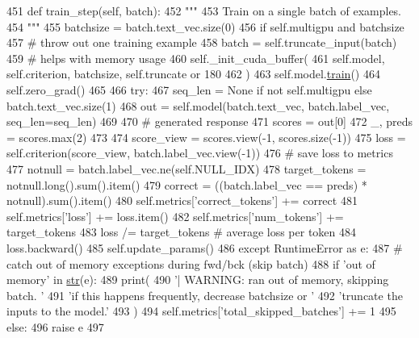 \begin{DoxyCode}
451     \textcolor{keyword}{def }train\_step(self, batch):
452         \textcolor{stringliteral}{"""}
453 \textcolor{stringliteral}{        Train on a single batch of examples.}
454 \textcolor{stringliteral}{        """}
455         batchsize = batch.text\_vec.size(0)
456         \textcolor{keywordflow}{if} self.multigpu \textcolor{keywordflow}{and} batchsize %
457             \textcolor{comment}{# throw out one training example}
458             batch = self.truncate\_input(batch)
459         \textcolor{comment}{# helps with memory usage}
460         self.\_init\_cuda\_buffer(
461             self.model, self.criterion, batchsize, self.truncate \textcolor{keywordflow}{or} 180
462         )
463         self.model.\hyperlink{namespaceprojects_1_1mastering__the__dungeon_1_1mturk_1_1tasks_1_1MTD_1_1run_a36a5f4f6f9df0611a6818610518d2cf0}{train}()
464         self.zero\_grad()
465 
466         \textcolor{keywordflow}{try}:
467             seq\_len = \textcolor{keywordtype}{None} \textcolor{keywordflow}{if} \textcolor{keywordflow}{not} self.multigpu \textcolor{keywordflow}{else} batch.text\_vec.size(1)
468             out = self.model(batch.text\_vec, batch.label\_vec, seq\_len=seq\_len)
469 
470             \textcolor{comment}{# generated response}
471             scores = out[0]
472             \_, preds = scores.max(2)
473 
474             score\_view = scores.view(-1, scores.size(-1))
475             loss = self.criterion(score\_view, batch.label\_vec.view(-1))
476             \textcolor{comment}{# save loss to metrics}
477             notnull = batch.label\_vec.ne(self.NULL\_IDX)
478             target\_tokens = notnull.long().sum().item()
479             correct = ((batch.label\_vec == preds) * notnull).sum().item()
480             self.metrics[\textcolor{stringliteral}{'correct\_tokens'}] += correct
481             self.metrics[\textcolor{stringliteral}{'loss'}] += loss.item()
482             self.metrics[\textcolor{stringliteral}{'num\_tokens'}] += target\_tokens
483             loss /= target\_tokens  \textcolor{comment}{# average loss per token}
484             loss.backward()
485             self.update\_params()
486         \textcolor{keywordflow}{except} RuntimeError \textcolor{keyword}{as} e:
487             \textcolor{comment}{# catch out of memory exceptions during fwd/bck (skip batch)}
488             \textcolor{keywordflow}{if} \textcolor{stringliteral}{'out of memory'} \textcolor{keywordflow}{in} \hyperlink{namespacegenerate__task__READMEs_a5b88452ffb87b78c8c85ececebafc09f}{str}(e):
489                 print(
490                     \textcolor{stringliteral}{'| WARNING: ran out of memory, skipping batch. '}
491                     \textcolor{stringliteral}{'if this happens frequently, decrease batchsize or '}
492                     \textcolor{stringliteral}{'truncate the inputs to the model.'}
493                 )
494                 self.metrics[\textcolor{stringliteral}{'total\_skipped\_batches'}] += 1
495             \textcolor{keywordflow}{else}:
496                 \textcolor{keywordflow}{raise} e
497 
\end{DoxyCode}

